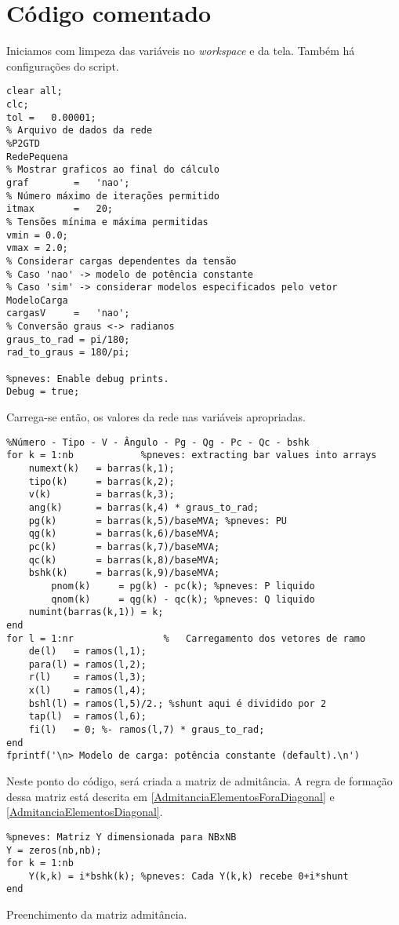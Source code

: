 \chapter{C\'odigo comentado}
\label{SectionCodigo}
Iniciamos com limpeza das variáveis no \textit{workspace} e da tela. Também há configurações do script.
\begin{verbatim}
clear all;
clc;
tol	=	0.00001;
% Arquivo de dados da rede
%P2GTD
RedePequena
% Mostrar graficos ao final do cálculo
graf		=	'nao';
% Número máximo de iterações permitido
itmax		=	20;
% Tensões mínima e máxima permitidas
vmin = 0.0;
vmax = 2.0;
% Considerar cargas dependentes da tensão
% Caso 'nao' -> modelo de potência constante
% Caso 'sim' -> considerar modelos especificados pelo vetor ModeloCarga
cargasV		=	'nao';
% Conversão graus <-> radianos
graus_to_rad = pi/180;
rad_to_graus = 180/pi;

%pneves: Enable debug prints.
Debug = true; 
\end{verbatim}
Carrega-se então, os valores da rede nas variáveis apropriadas.
\begin{verbatim}
%Número - Tipo - V - Ângulo - Pg - Qg - Pc - Qc - bshk
for k = 1:nb            %pneves: extracting bar values into arrays
    numext(k)   = barras(k,1);                  
    tipo(k)     = barras(k,2);                  
    v(k)        = barras(k,3);                  
    ang(k)      = barras(k,4) * graus_to_rad;   
    pg(k)       = barras(k,5)/baseMVA; %pneves: PU 
    qg(k)       = barras(k,6)/baseMVA;
    pc(k)       = barras(k,7)/baseMVA;
    qc(k)       = barras(k,8)/baseMVA;
    bshk(k)     = barras(k,9)/baseMVA;
        pnom(k)     = pg(k) - pc(k); %pneves: P liquido
        qnom(k)     = qg(k) - qc(k); %pneves: Q liquido
    numint(barras(k,1)) = k;
end
for l = 1:nr                %	Carregamento dos vetores de ramo
	de(l)   = ramos(l,1);
	para(l) = ramos(l,2);
	r(l)    = ramos(l,3);
	x(l)    = ramos(l,4);
	bshl(l) = ramos(l,5)/2.; %shunt aqui é dividido por 2
	tap(l)  = ramos(l,6);
	fi(l)   = 0; %- ramos(l,7) * graus_to_rad;
end
fprintf('\n> Modelo de carga: potência constante (default).\n')
\end{verbatim}
Neste ponto do código, será criada a matriz de admitância. A regra de formação dessa matriz está descrita em \ref{AdmitanciaElementosForaDiagonal} e \ref{AdmitanciaElementosDiagonal}. 
\begin{verbatim}
%pneves: Matriz Y dimensionada para NBxNB
Y = zeros(nb,nb);
for k = 1:nb
    Y(k,k) = i*bshk(k); %pneves: Cada Y(k,k) recebe 0+i*shunt
end
\end{verbatim}
Preenchimento da matriz admitância.\\


